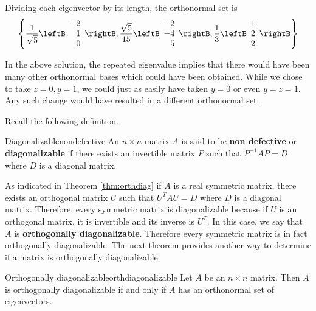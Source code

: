 \begin{solution}
Dividing each eigenvector by its length, the orthonormal set is 
\begin{equation*}
\left\{ \frac{1}{\sqrt{5}} \leftB 
\begin{array}{r}
-2\\ 
1 \\ 
0
\end{array}
\rightB , \frac{\sqrt{5}}{15} \leftB 
\begin{array}{r}
-2 \\ 
-4 \\ 
5
\end{array}
\rightB , \frac{1}{3}\leftB
\begin{array}{r}
1 \\ 
2 \\ 
2
\end{array}
\rightB \right\}
\end{equation*}

\end{solution}

In the above solution, the repeated eigenvalue implies that there would have been many other
orthonormal bases which could have been obtained. While we chose to
take $z=0, y=1$, we could just as easily have taken $y=0$
or even $y=z=1.$ Any such change would have resulted in a different
orthonormal set. 

Recall the following definition.

\begin{definition}{Diagonalizable}{nondefective}
An $n\times n$ matrix $A$ is said to be \textbf{non defective}
or \textbf{diagonalizable}
 if there exists an invertible matrix $P$ such that $
P^{-1}AP=D$ where $D$ is a diagonal matrix.
\end{definition}

As indicated in Theorem \ref{thm:orthdiag} if $A$ is a real symmetric matrix, there exists an
orthogonal matrix $U$ such that $U^{T}AU=D$ where $D$ is a diagonal matrix. Therefore,
every symmetric matrix is diagonalizable because if $U$ is an orthogonal
matrix, it is invertible and its inverse is $U^{T}$. In this case, we say that $A$ is \textbf{orthogonally diagonalizable}. Therefore every symmetric matrix is in fact orthogonally diagonalizable. The next theorem provides another way to determine if a matrix is orthogonally diagonalizable. 

\begin{theorem}{Orthogonally diagonalizable}{orthdiagonalizable}
Let $A$ be an $n \times n$ matrix. Then $A$ is orthogonally diagonalizable if and only if $A$ has an orthonormal set of eigenvectors. 
\end{theorem}

